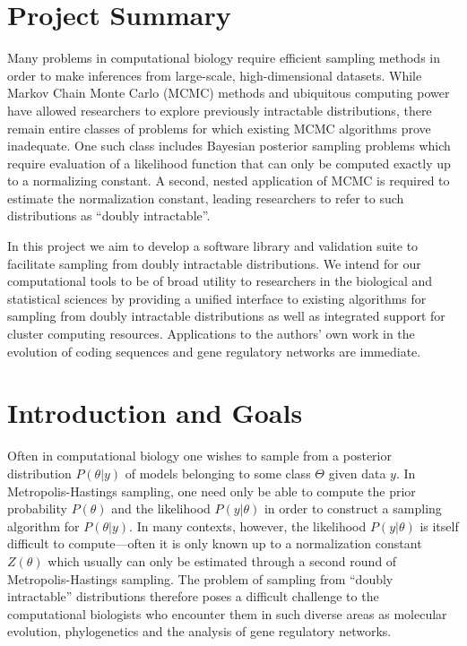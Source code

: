 \documentclass{article}
\begin{document}

\section{Project Summary} 


Many problems in computational biology require efficient sampling
methods in order to make inferences from large-scale, high-dimensional
datasets.  While Markov Chain Monte Carlo (MCMC) methods and
ubiquitous computing power have allowed researchers to explore
previously intractable distributions, there remain entire classes of
problems for which existing MCMC algorithms prove inadequate.  One
such class includes Bayesian posterior sampling problems which require
evaluation of a likelihood function that can only be computed exactly
up to a normalizing constant.  A second, nested application of MCMC is
required to estimate the normalization constant, leading researchers
to refer to such distributions as ``doubly intractable''\cite{murray06}.

In this project we aim to develop a software library and validation
suite to facilitate sampling from doubly intractable distributions.
We intend for our computational tools to be of broad utility to
researchers in the biological and statistical sciences by providing a
unified interface to existing algorithms for sampling from doubly
intractable distributions as well as integrated support for cluster
computing resources.  Applications to the authors' own work in the
evolution of coding sequences and gene regulatory networks are immediate.


\section{Introduction and Goals}
Often in computational biology one wishes to sample from a posterior
distribution $P(\theta|y)$ of models belonging to some class $\Theta$
given data $y$.  In Metropolis-Hastings sampling, one need only be
able to compute the prior probability $P(\theta)$ and the likelihood
$P(y|\theta)$ in order to construct a sampling algorithm for
$P(\theta|y)$.  In many contexts, however, the likelihood
$P(y|\theta)$ is itself difficult to compute---often it is only known
up to a normalization constant $Z(\theta)$ which usually can only be
estimated through a second round of Metropolis-Hastings sampling.  The
problem of sampling from ``doubly intractable'' distributions
therefore poses a difficult challenge to the computational biologists
who encounter them in such diverse areas as molecular evolution,
phylogenetics and the analysis of gene regulatory networks.
\end{document}
